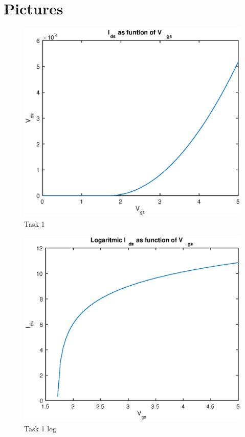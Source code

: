 \documentclass[11pt,a4paper]{report}
\begin{document}
\section{Pictures}
\begin{figure}[ht!]
\caption{Task 1}
\centering
\includegraphics[scale=0.9]{task1.eps}
\end{figure}
\begin{figure}[ht!]
\caption{Task 1 log}
\centering
\includegraphics[scale=0.9]{task1-log.eps}
\end{figure}
\end{document}
